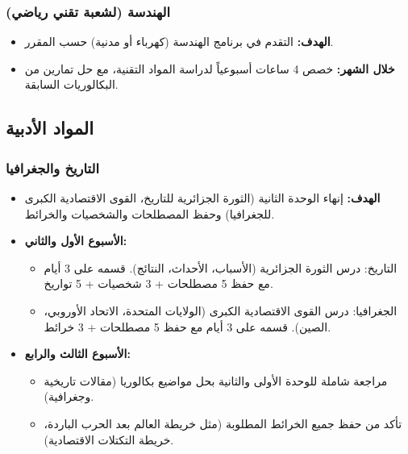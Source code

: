 \documentclass[12pt,a4paper]{book}
\begin{document}
	\subsubsection*{الهندسة (لشعبة تقني رياضي)}
	\begin{itemize}
		\item \textbf{الهدف:} التقدم في برنامج الهندسة (كهرباء أو مدنية) حسب المقرر.
		\item \textbf{خلال الشهر:} خصص 4 ساعات أسبوعياً لدراسة المواد التقنية، مع حل تمارين من البكالوريات السابقة.
	\end{itemize}
	
	\subsection{المواد الأدبية}
	
	\subsubsection*{التاريخ والجغرافيا}
	\begin{itemize}
		\item \textbf{الهدف:} إنهاء الوحدة الثانية (الثورة الجزائرية للتاريخ، القوى الاقتصادية الكبرى للجغرافيا) وحفظ المصطلحات والشخصيات والخرائط.
		\item \textbf{الأسبوع الأول والثاني:}
		\begin{itemize}
			\item التاريخ: درس الثورة الجزائرية (الأسباب، الأحداث، النتائج). قسمه على 3 أيام مع حفظ 5 مصطلحات + 3 شخصيات + 5 تواريخ.
			\item الجغرافيا: درس القوى الاقتصادية الكبرى (الولايات المتحدة، الاتحاد الأوروبي، الصين). قسمه على 3 أيام مع حفظ 5 مصطلحات + 3 خرائط.
		\end{itemize}
		\item \textbf{الأسبوع الثالث والرابع:}
		\begin{itemize}
			\item مراجعة شاملة للوحدة الأولى والثانية بحل مواضيع بكالوريا (مقالات تاريخية وجغرافية).
			\item تأكد من حفظ جميع الخرائط المطلوبة (مثل خريطة العالم بعد الحرب الباردة، خريطة التكتلات الاقتصادية).
		\end{itemize}
	\end{itemize}
	
\end{document}
